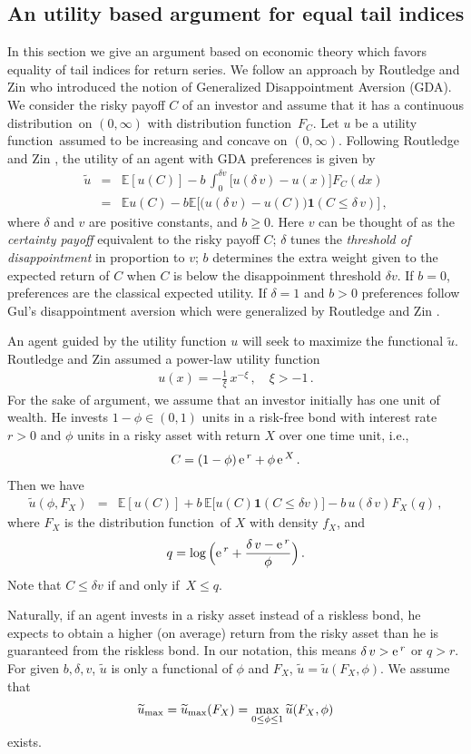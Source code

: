 \documentclass[11pt,a4]{amsart}
\newcommand{\blue}{\color{darkblue}}
\newcommand{\ex}{{\rm e}\,}
\newcommand{\df}{distribution function}
\newcommand{\beao}{\begin{eqnarray*}}
\newcommand{\eeao}{\end{eqnarray*}\noindent}
\newcommand{\beam}{\begin{eqnarray}}
\newcommand{\eeam}{\end{eqnarray}\noindent}
\newcommand{\wt}{\widetilde}
\newcommand{\fif}{if and only if}
\newcommand{\fct}{function}
\newcommand{\ds}{distribution}
\newcommand{\E }{{\mathbb E}}
\newcommand{\1}{{\mathbf 1}}
\begin{document}
\subsection{An utility based argument for equal tail indices}\label{sec:3}
In this section we give an argument based on economic theory which  favors equality of  tail indices for return series.
We follow an approach by Routledge and Zin \cite{routledge2010generalized} who introduced the notion of
Generalized Disappointment Aversion (GDA). We consider the risky payoff $C$ of an investor and assume that
it has a continuous \ds\ on $(0,\infty)$ with \df\ $F_C$. Let $u$ be a utility \fct\ assumed to be increasing and concave on $(0,\infty)$.
Following Routledge and Zin \cite{routledge2010generalized},
the utility of an agent with GDA preferences is given by
\beao%
  \wt u&=& \E [u(C)] - b\, \int_{0}^{\delta v}
  \big[ u(\delta \,v) - u(x) \big] F_C(dx)\nonumber\\&=& \E u(C) - b \E\big[\big(u(\delta \,v) - u(C)\big)\1( C \le  \delta \,v)\big]\,,
\eeao
where $\delta $ and $v$ are positive constants, and $b\ge 0$.
  Here $v$ can be thought of as the {\em certainty payoff} equivalent to the
 risky payoff $C$; $\delta$ tunes the {\em threshold of 
   disappointment} in proportion to $v$; $b$ determines the extra
 weight given to the expected return of $C$ when $C$ is below the
 disappoinment threshold $\delta v$.
 If $b=0$, preferences are the classical expected utility. If
 $\delta=1$ and $b>0$ preferences follow Gul's \cite{gul:1991} 
disappointment aversion which were generalized by Routledge and Zin
\cite{routledge2010generalized}.
\par
An agent guided by the utility function $u$ will seek to maximize the
\fct al $\wt u$.
Routledge and Zin assumed a power-law utility function 
\beam\label{eq:u}
u(x)=-\frac{1}{\xi}\,x^{-\xi}\,,\quad \xi>-1\,. 
\eeam
For the sake of argument, we assume that an investor initially has one
unit of wealth. He invests $1-\phi\in (0,1)$ units in a risk-free 
bond with interest rate $r>0$ and $\phi$ units in a risky asset with
return $X$ over one time unit, i.e.,
\beam\label{eq:xxie1}
  C = (1 - \phi)\, \ex^{r} + \phi \,\ex^{X}\,.
\eeam
Then we have 
\beao
\wt u(\phi,F_X) &=& \E [u(C)] + b\, \E \big[u(C)\1(C \le  \delta v)\big] - b \,u(\delta\, v) F_X(q)\,, %
\eeao
where $F_X$ is the \df\ of $X$ with density $f_X$, and
\beao
  q = %
\log\Big(
    \ex^r + {\delta \,v - \ex^r \over \phi}
  \Big)\,.
\eeao
Note that $C \le \delta v$ \fif\ $X \le  q$. 
\par
Naturally, if an agent invests in
a risky asset instead of a riskless bond, he expects to obtain a
higher (on average) return from the risky asset than he is guaranteed from the
riskless bond. In our notation, this means $\delta \,v > \ex^r$ or
$q > r $. For given $b,\delta,v$, $\wt u$ is only a functional of $\phi$ and $F_X$,
$\wt u=\wt u (F_X, \phi)$.
We assume that
\beao
\wt u_{\rm max}=\wt u_{\rm max}(F_X) = \max_{0 \le  \phi \leq 1} \wt u (F_X,\phi)
\eeao
exists. 
\end{document}
